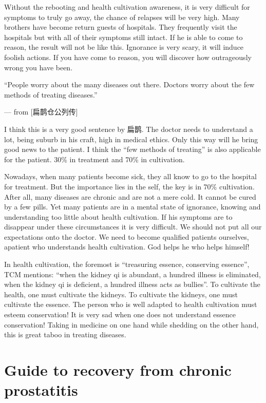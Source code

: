 \documentclass[
]{book}
\begin{document}
Without the rebooting and health cultivation awareness, it is very difficult for symptoms to truly go away, the chance of relapses will be very high. Many brothers have become return guests of hospitals. They frequently visit the hospitals but with all of their symptoms still intact. If he is able to come to reason, the result will not be like this. Ignorance is very scary, it will induce foolish actions. If you have come to reason, you will discover how outrageously wrong you have been.

``People worry about the many diseases out there. Doctors worry about the few methods of treating diseases.''

--- from {[}扁鹊仓公列传{]}

I think this is a very good sentence by 扁鹊. The doctor needs to understand a lot, being suburb in his craft, high in medical ethics. Only this way will he bring good news to the patient. I think the ``few methods of treating'' is also applicable for the patient. 30\% in treatment and 70\% in cultivation.

Nowadays, when many patients become sick, they all know to go to the hospital for treatment. But the importance lies in the self, the key is in 70\% cultivation. After all, many diseases are chronic and are not a mere cold. It cannot be cured by a few pills. Yet many patients are in a mental state of ignorance, knowing and understanding too little about health cultivation. If his symptoms are to disappear under these circumstances it is very difficult. We should not put all our expectations onto the doctor. We need to become qualified patients ourselves, apatient who understands health cultivation. God helps he who helps himself!

In health cultivation, the foremost is ``treasuring essence, conserving essence'', TCM mentions: ``when the kidney qi is abundant, a hundred illness is eliminated, when the kidney qi is deficient, a hundred illness acts as bullies''. To cultivate the health, one must cultivate the kidneys. To cultivate the kidneys, one must cultivate the essence. The person who is well adapted to health cultivation must esteem conservation! It is very sad when one does not understand essence conservation! Taking in medicine on one hand while shedding on the other hand, this is great taboo in treating diseases.

\hypertarget{guide-to-recovery-from-chronic-prostatitis}{%
\section{Guide to recovery from chronic prostatitis}\label{guide-to-recovery-from-chronic-prostatitis}}
\end{document}
